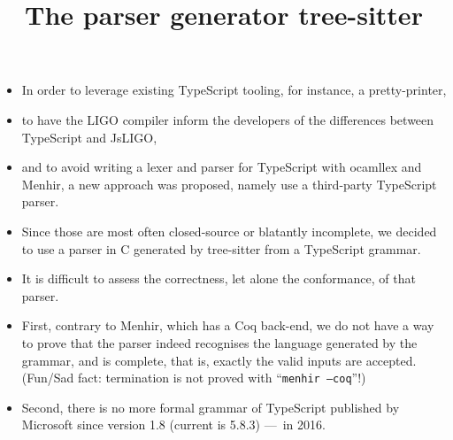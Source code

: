 \documentclass[wide]{slides}
\newcommand{\JsLIGO}[0]{\textsf{JsLIGO}}
\newcommand{\Menhir}[0]{\textsf{Menhir}}
\newcommand{\TypeScript}[0]{\textsf{TypeScript}}
\newcommand{\TreeSitter}[0]{\textsf{tree-sitter}}
\begin{document}
\begin{slide}
  \title{The parser generator tree-sitter}

  \begin{itemize}

    \item In order to leverage existing \TypeScript{} tooling, for
      instance, a pretty\hyp{}printer,

    \item to have the LIGO compiler inform the developers of the
      differences between \TypeScript{} and \JsLIGO{},

    \item and to avoid writing a lexer and parser for \TypeScript{}
      with \textsf{ocamllex} and \Menhir{}, a new approach was
      proposed, namely use a third\hyp{}party \TypeScript{} parser.

    \item Since those are most often closed\hyp{}source or blatantly
      incomplete, we decided to use a parser in C generated by
      \TreeSitter{} from a \TypeScript{} grammar.

    \item It is difficult to assess the correctness, let alone the
      conformance, of that parser.

    \item First, contrary to \Menhir{}, which has a \textsf{Coq}
      back\hyp{}end, we do not have a way to prove that the parser
      indeed recognises the language generated by the grammar, and is
      complete, that is, exactly the valid inputs are
      accepted. (Fun/Sad fact: termination is not proved with
      ``\texttt{menhir --coq}''!)

    \item Second, there is no more formal grammar of \TypeScript{}
      published by Microsoft since version 1.8 (current is 5.8.3)
      ---~in 2016.

  \end{itemize}

\end{slide}
\end{document}
